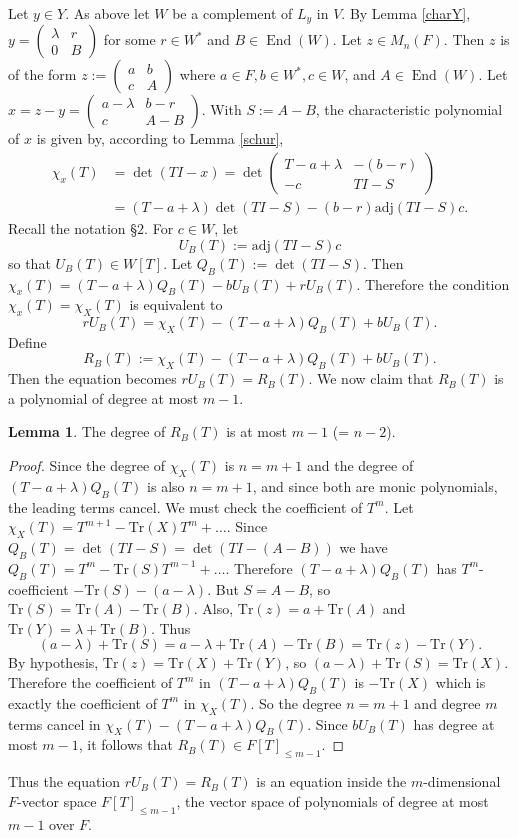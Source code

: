 \documentclass[preprint,11pt]{amsart}
\theoremstyle{definition}
\numberwithin{thm}{section}
\newtheorem{lem}[thm]{Lemma}
\newcommand{\End}{\operatorname{End}}
\newcommand{\lam}{\lambda}
\newcommand{\tr}{\textrm{Tr}}
\newcommand{\adj}{\textrm{adj}}
\begin{document}
\noindent Let $y \in Y$. As above let $W$ be a complement of $L_y$ in $V$.  By Lemma \ref{charY},  $y = \begin{pmatrix} \lam & r \\ 0 & B \end{pmatrix}$ for some $r \in W^*$ and $B \in \End(W)$. Let $z \in M_n(F)$. Then $z$ is of the form 
$
z := \begin{pmatrix} a & b \\ c & A \end{pmatrix}
$
where $a \in F, b \in W^*, c \in W$, and $A \in \End(W)$. Let $x = z - y = \begin{pmatrix} a  - \lam & b -r \\ c & A- B \end{pmatrix}$. With $S := A- B$, the  characteristic polynomial of $x$ is given by, according to Lemma \ref{schur}, 
\begin{align*}
\chi_x(T) &= \det(TI-x) = \det \begin{pmatrix} T - a + \lam & - (b-r) \\ -c & TI - S \end{pmatrix} \\
&= (T- a + \lam) \det(TI-S) - (b-r) \adj(TI-S)c.
\end{align*}
 Recall the notation \S $2$. For $c \in W$, let 
$$
U_B(T) := \adj(TI-S)c
$$
so that $U_B(T) \in W[T]$. Let $Q_B(T) := \det(TI-S)$. Then $\chi_x(T) = (T - a + \lam)Q_B(T) - b U_B(T) + r U_B(T)$. Therefore the condition $\chi_x(T) = \chi_X(T)$ is equivalent to 
$$
rU_B(T) = \chi_X(T) - (T - a + \lam) Q_B(T)  + b U_B(T).
$$
Define
$$
R_B(T) := \chi_X(T)  - (T - a + \lam) Q_B(T) + b U_B(T).
$$
Then the equation becomes $rU_B(T) = R_B(T)$. We now claim that $R_B(T)$ is a polynomial of degree at most $m-1$.

\begin{lem}\label{R_B(T)_degree}
The degree of $R_B(T)$ is at most $m-1$ (= $n-2$).
\end{lem}
\begin{proof}
Since the degree of $\chi_X(T)$ is $n = m +1$ and the degree of $(T- a + \lam)Q_B(T)$ is also $n = m+1$, and since both are monic polynomials,  the leading terms cancel. We must check the coefficient of $T^m$.  Let $\chi_X(T) = T^{m+1} - \tr(X) T^m + \ldots$. Since $Q_B(T) = \det(TI- S) = \det(TI- (A-B))$ we have $Q_B(T) = T^m  - \tr(S) T^{m-1}+ \ldots$. Therefore $(T - a + \lam) Q_B(T)$ has $T^m$-coefficient $- \tr(S) - (a- \lam)$. But $S = A - B$, so $\tr(S)= \tr(A)- \tr(B)$. Also, $\tr(z) = a + \tr(A)$ and $\tr(Y) = \lam + \tr(B)$. Thus
$$
(a- \lam	) + \tr(S) = a - \lam + \tr(A)- \tr(B) = \tr(z) - \tr(Y).
$$
By hypothesis, $\tr(z) = \tr(X) + \tr(Y)$, so $(a- \lam) + \tr(S) = \tr(X)$. Therefore the coefficient of $T^m$ in $(T- a + \lam) Q_B(T)$ is $- \tr(X)$ which is exactly the coefficient of $T^m$ in $\chi_X(T)$. So the degree $n = m+1$ and degree $m$ terms cancel in $\chi_X(T) - (T - a + \lam) Q_B(T)$. Since $b U_B(T)$ has degree at most $m-1$, it follows that $R_B(T) \in F[T]_{\leq m-1}$.
\end{proof}
Thus the equation $r U_B(T) = R_B(T)$ is an equation inside the $m$-dimensional $F$-vector space $F[T]_{\leq m-1}$, the vector space of polynomials of degree at most $m-1$ over $F$.
\end{document}

